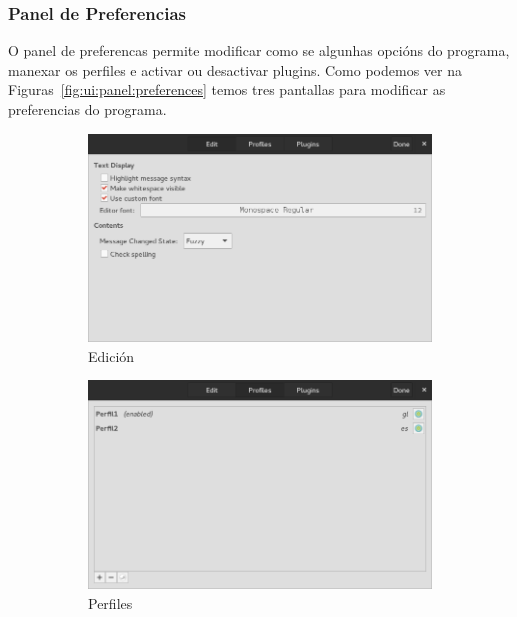 \subsubsection{Panel de Preferencias}
O panel de preferencas permite modificar como se algunhas opcións do programa, manexar os perfiles e activar ou desactivar plugins. Como podemos ver na Figuras~\ref{fig:ui:panel:preferences} temos tres pantallas para modificar as preferencias do programa.

\begin{figure}[h!]
  \centering
  \begin{subfigure}[b]{0.56\textwidth}
    \includegraphics[width=\textwidth]{img/panel_preferencias_edicion.png}
    \caption{Edición}
  \end{subfigure}
  \begin{subfigure}[b]{0.56\textwidth}
    \includegraphics[width=\textwidth]{img/panel_preferencias_perfiles.png}
    \caption{Perfiles}
  \end{subfigure}
  \begin{subfigure}[b]{0.56\textwidth}

\end{subfigure}
\end{figure}
